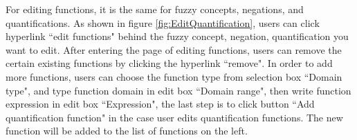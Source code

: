 For editing functions, it is the same for fuzzy concepts, negations, and quantifications. As shown in figure \ref{fig:EditQuantification}, users can click hyperlink ``edit functions" behind the fuzzy concept, negation, quantification you want to edit. After entering the page of editing functions, users can remove the certain existing functions by clicking the hyperlink ``remove". In order to add more functions, users can choose the function type  from selection box ``Domain type", and type function domain in edit box ``Domain range", then write function expression in edit box ``Expression", the last step is to click button ``Add quantification function" in the case user edits quantification functions. The new function will be added to the list of functions on the left.


